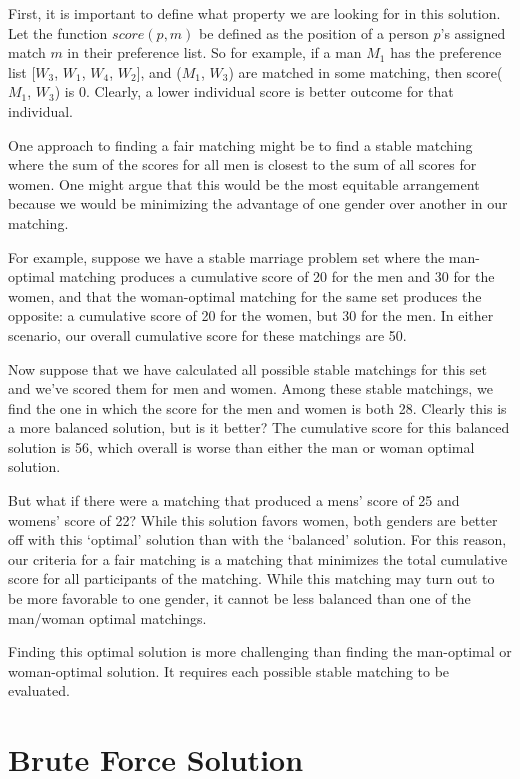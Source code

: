 \documentclass[a4paper]{article}
\begin{document}
First, it is important to define what property we are looking for in this solution. Let the function $score(p, m)$ be defined as the position of a person $p$'s assigned match $m$ in their preference list. So for example, if a man $M_1$ has the preference list [$W_3$, $W_1$, $W_4$, $W_2$], and ($M_1$, $W_3$) are matched in some matching, then score($M_1$, $W_3$) is $0$. Clearly, a lower individual score is better outcome for that individual.

One approach to finding a fair matching might be to find a stable matching where the sum of the scores for all men is closest to the sum of all scores for women. One might argue that this would be the most equitable arrangement because we would be minimizing the advantage of one gender over another in our matching.

For example, suppose we have a stable marriage problem set where the man-optimal matching produces a cumulative score of 20 for the men and 30 for the women, and that the woman-optimal matching for the same set produces the opposite: a cumulative score of 20 for the women, but 30 for the men.  In either scenario, our overall cumulative score for these matchings are 50.

Now suppose that we have calculated all possible stable matchings for this set and we've scored them for men and women. Among these stable matchings, we find the one in which the score for the men and women is both 28. Clearly this is a more balanced solution, but is it better? The cumulative score for this balanced solution is 56, which overall is worse than either the man or woman optimal solution.

But what if there were a matching that produced a mens' score of 25 and womens' score of 22? While this solution favors women, both genders are better off with this `optimal' solution than with the `balanced' solution. For this reason, our criteria for a fair matching is a matching that minimizes the total cumulative score for all participants of the matching. While this matching may turn out to be more favorable to one gender, it cannot be less balanced than one of the man/woman optimal matchings.

Finding this optimal solution is more challenging than finding the man-optimal or woman-optimal solution. It requires each possible stable matching to be evaluated.

\section{Brute Force Solution}
\end{document}
